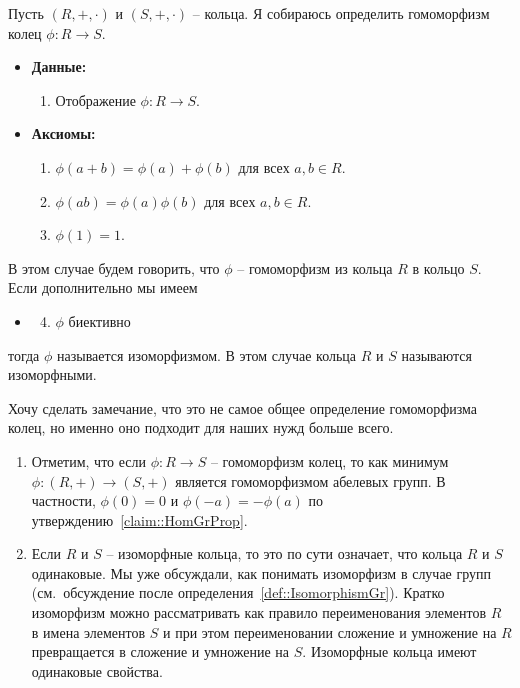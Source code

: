\begin{definition}
Пусть $(R, +, \cdot)$ и $(S, +, \cdot)$ -- кольца.
Я собираюсь определить гомоморфизм колец $\phi\colon R\to S$.
\begin{itemize}
\item\textbf{Данные:} 
\begin{enumerate}
\item Отображение $\phi\colon R\to S$.
\end{enumerate}

\item\textbf{Аксиомы:}
\begin{enumerate}
\item $\phi(a + b) = \phi(a) + \phi(b)$ для всех $a, b\in R$.

\item $\phi(ab) = \phi(a)\phi(b)$ для всех $a,b\in R$.

\item $\phi(1) = 1$.
\end{enumerate}
\end{itemize}
В этом случае будем говорить, что $\phi$ -- гомоморфизм из кольца $R$ в кольцо $S$.
Если дополнительно мы имеем
\begin{itemize}
\item[]
\begin{enumerate}
\setcounter{enumi}{3}
\item $\phi$ биективно
\end{enumerate}
\end{itemize}
тогда $\phi$ называется изоморфизмом.
В этом случае кольца $R$ и $S$ называются изоморфными.
\end{definition}

Хочу сделать замечание, что это не самое общее определение гомоморфизма колец, но именно оно подходит для наших нужд больше всего.

\begin{remarks}
\begin{enumerate}
\item Отметим, что если $\phi\colon R\to S$ -- гомоморфизм колец, то как минимум $\phi\colon (R,+) \to (S, +)$ является гомоморфизмом абелевых групп.
В частности, $\phi(0) = 0$ и $\phi(-a) = - \phi(a)$ по утверждению~\ref{claim::HomGrProp}.

\item Если $R$ и $S$ -- изоморфные кольца, то это по сути означает, что кольца $R$ и $S$ одинаковые.
Мы уже обсуждали, как понимать изоморфизм в случае групп (см.~обсуждение после определения~\ref{def::IsomorphismGr}).
Кратко изоморфизм можно рассматривать как правило переименования элементов $R$ в имена элементов $S$ и при этом переименовании сложение и умножение на $R$ превращается в сложение и умножение на $S$.
Изоморфные кольца имеют одинаковые свойства.
\end{enumerate}
\end{remarks}

